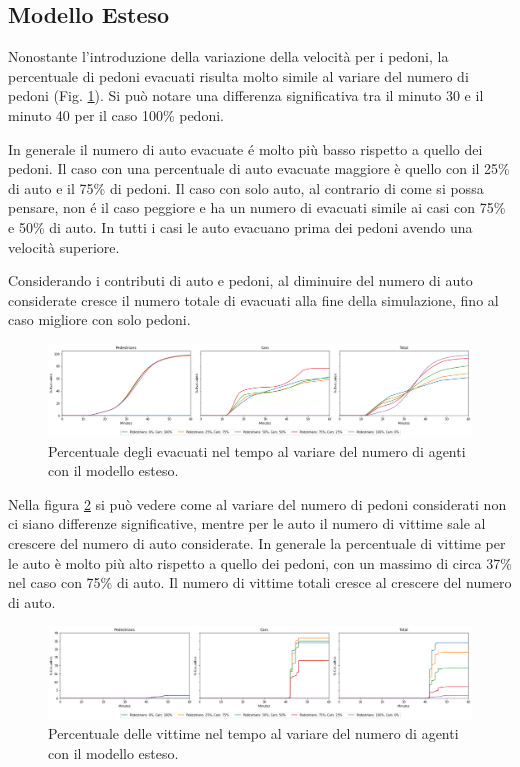 \subsection{Modello Esteso}
Nonostante l'introduzione della variazione della velocità per i pedoni, 
la percentuale di pedoni evacuati risulta molto simile al variare del numero di pedoni (Fig. \ref{fig:analisi-new-evacuated}). 
Si può notare una differenza significativa tra il minuto 30 e il minuto 40 per il caso 100\% pedoni.

In generale il numero di auto evacuate é molto più basso rispetto a quello dei pedoni. 
Il caso con una percentuale di auto evacuate maggiore è quello con il 25\% di auto e il 75\% di pedoni.
Il caso con solo auto, al contrario di come si possa pensare, non é il caso peggiore e ha un numero di evacuati simile ai casi 
con 75\% e 50\% di auto.
%
In tutti i casi le auto evacuano prima dei pedoni avendo una velocità superiore.

Considerando i contributi di auto e pedoni, al diminuire del numero di auto considerate cresce il numero totale di evacuati alla fine della simulazione,
fino al caso migliore con solo pedoni.

\begin{figure}[h]
    \centering
    \includegraphics[width=\textwidth]{images/analisi/new-evacuated.png}
    \caption{Percentuale degli evacuati nel tempo al variare del numero di agenti con il modello esteso.}
    \label{fig:analisi-new-evacuated}
\end{figure}

Nella figura \ref{fig:analisi-new-casualties} si può vedere come al variare del numero di pedoni considerati 
non ci siano differenze significative, mentre per le auto il numero di vittime sale al crescere del numero di auto considerate.
In generale la percentuale di vittime per le auto è molto più alto rispetto a quello dei pedoni, con un massimo di circa 37\% nel caso con 75\% di auto. 
%
Il numero di vittime totali cresce al crescere del numero di auto.

\begin{figure}[h]
    \centering
    \includegraphics[width=\textwidth]{images/analisi/new-casualties.png}
    \caption{Percentuale delle vittime nel tempo al variare del numero di agenti con il modello esteso.}
    \label{fig:analisi-new-casualties}
\end{figure}

